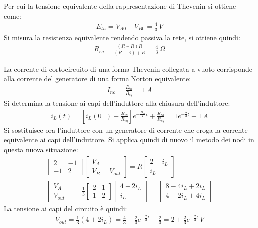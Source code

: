 \documentclass{article}
\begin{document}
Per cui la tensione equivalente della rappresentazione di Thevenin si ottiene come:
\begin{gather*}
    E_{th}=V_{A0}-V_{B0}=\displaystyle\frac{4}{3}\,V
\end{gather*}
Si misura la resistenza equivalente rendendo passiva la rete, si ottiene quindi:
\begin{gather*}
    R_{eq}=\displaystyle\frac{(R+R)R}{(R+R)+R}=\frac{4}{3}\,\Omega
\end{gather*}

La corrente di cortocircuito di una forma Thevenin collegata a vuoto corrisponde alla corrente del generatore di una forma Norton equivalente:
\begin{gather*}
    I_{no}=\displaystyle\frac{E_{th}}{R_{eq}}=1\,A
\end{gather*}
Si determina la tensione ai capi dell'induttore alla chiusura dell'induttore: 
\begin{gather*}
    i_L(t)=\left[\displaystyle i_L(0^-)-\frac{E_{th}}{R_{eq}}\right]e^{-\frac{R_{eq}}{L}t}+\frac{E_{th}}{R_{eq}}=1e^{-\frac{2}{3}t}+1\,A
\end{gather*}
Si sostituisce ora l'induttore con un generatore di corrente che eroga la corrente equivalente ai capi dell'induttore. Si applica quindi di nuovo il metodo dei nodi in questa 
nuova situazione:
\begin{gather*}
    \begin{bmatrix}
        2&-1\\-1&2
    \end{bmatrix}\begin{bmatrix}
        V_{A}\\V_{B}=V_{out}
    \end{bmatrix}=
    R\begin{bmatrix}
        2-i_L\\i_L
    \end{bmatrix}\\
    \begin{bmatrix}
        V_{A}\\V_{out}
    \end{bmatrix}=\displaystyle\frac{1}{3}
    \begin{bmatrix}
        2&1\\1&2
    \end{bmatrix}\begin{bmatrix}
        4-2i_L\\i_L
    \end{bmatrix}=\begin{bmatrix}
        8-4i_L+2i_L\\
        4-2i_L+4i_L
    \end{bmatrix}
\end{gather*}
La tensione ai capi del circuito è quindi: 
\begin{gather}
    V_{out}=\displaystyle\frac{1}{3}\left(4+2i_L\right)=\frac{4}{3}+\frac{2}{3}e^{-\frac{2}{3}t}+\frac{2}{3}=2+\frac{2}{3}e^{-\frac{2}{3}t}\,V
\end{gather}
\end{document}
